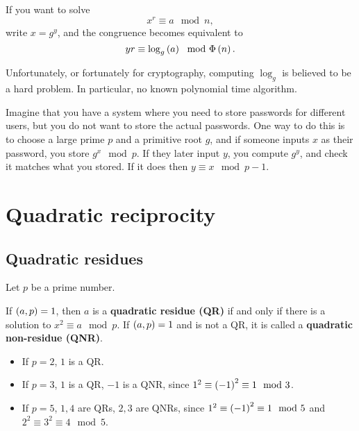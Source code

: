 \begin{example*}
If you want to solve
$$ x^r \equiv a \mod n, $$
write $ x = g^y $, and the congruence becomes equivalent to
$$ yr \equiv \log_g\left( a \right) \mod \Phi\left( n \right). $$
\end{example*}

Unfortunately, or fortunately for cryptography, computing $ \log_g $ is believed to be a hard problem. In particular, no known polynomial time algorithm.

\begin{example*}
Imagine that you have a system where you need to store passwords for different users, but you do not want to store the actual passwords. One way to do this is to choose a large prime $ p $ and a primitive root $ g $, and if someone inputs $ x $ as their password, you store $ g^x \mod p $. If they later input $ y $, you compute $ g^y $, and check it matches what you stored. If it does then $ y \equiv x \mod p - 1 $.
\end{example*}

\pagebreak

\section{Quadratic reciprocity}

\subsection{Quadratic residues}

Let $ p $ be a prime number.

\begin{definition}
If $ \left( a, p \right) = 1 $, then $ a $ is a \textbf{quadratic residue (QR)} if and only if there is a solution to $ x^2 \equiv a \mod p $. If $ \left( a, p \right) = 1 $ and is not a QR, it is called a \textbf{quadratic non-residue (QNR)}.
\end{definition}

\begin{example*}
\hfill
\begin{itemize}
\item If $ p = 2 $, $ 1 $ is a QR.
\item If $ p = 3 $, $ 1 $ is a QR, $ -1 $ is a QNR, since $ 1^2 \equiv \left( -1 \right)^2 \equiv 1 \mod 3 $.
\item If $ p = 5 $, $ 1, 4 $ are QRs, $ 2, 3 $ are QNRs, since $ 1^2 \equiv \left( -1 \right)^2 \equiv 1 \mod 5 $ and $ 2^2 \equiv 3^2 \equiv 4 \mod 5 $.
\end{itemize}
\end{example*}

